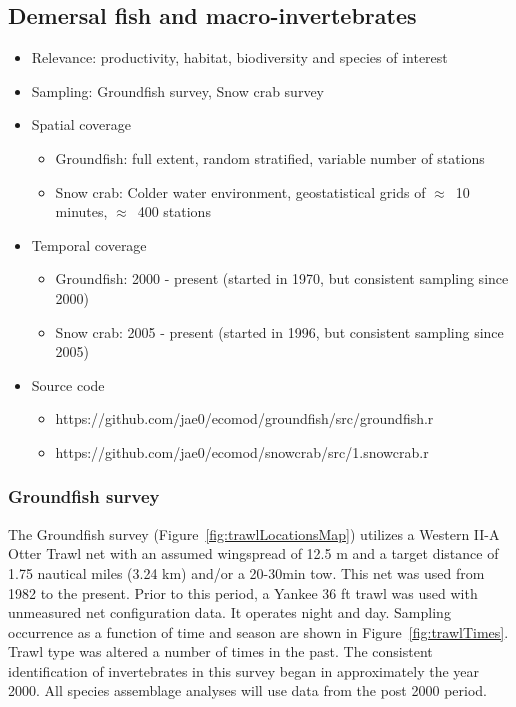 \documentclass[letterpaper,portrait,11pt]{scrartcl}
\numberwithin{equation}{section}		%
\numberwithin{figure}{section}		%
\numberwithin{table}{section}				%
\begin{document}
\subsection{Demersal fish and macro-invertebrates}
\begin{itemize}
  \item Relevance:  productivity, habitat, biodiversity and species of interest
  \item Sampling:  Groundfish survey, Snow crab survey 
  \item Spatial coverage
    \begin{itemize}
      \item Groundfish: full extent, random stratified, variable number of stations
      \item Snow crab: Colder water environment, geostatistical grids of $\approx$~10 minutes, $\approx$~400 stations 
    \end{itemize}
  \item Temporal coverage
    \begin{itemize}
      \item Groundfish: 2000 - present (started in 1970, but consistent sampling since 2000)
      \item Snow crab: 2005 - present (started in 1996, but consistent sampling since 2005)
    \end{itemize}

  \item Source code
      \begin{itemize}
        \item https://github.com/jae0/ecomod/groundfish/src/groundfish.r
        \item https://github.com/jae0/ecomod/snowcrab/src/1.snowcrab.r
      \end{itemize}
  
\end{itemize}


\subsubsection{Groundfish survey}

The Groundfish survey (Figure~\ref{fig:trawlLocationsMap}) utilizes a Western II-A Otter Trawl net with an assumed wingspread of 12.5 m and a target distance of 1.75 nautical miles (3.24 km) and/or a 20-30min tow. This net was used from 1982 to the present. Prior to this period, a Yankee 36 ft trawl was used with unmeasured net configuration data. It operates night and day. Sampling occurrence as a function of time and season are shown in Figure~\ref{fig:trawlTimes}. Trawl type was altered a number of times in the past. The consistent identification of invertebrates in this survey began in approximately the year 2000. All species assemblage analyses will use data from the post 2000 period.
\end{document}
